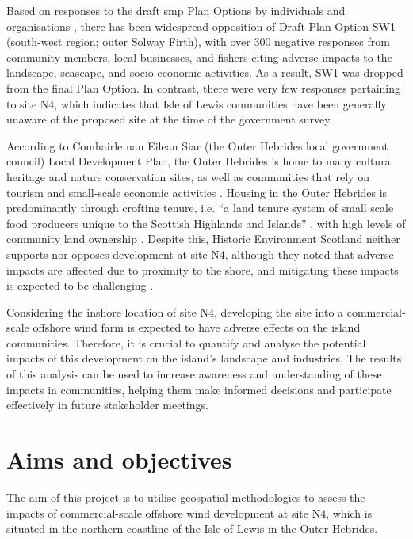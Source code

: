 Based on responses to the draft \gls{smp} Plan Options by individuals and organisations \autocite{govscot-smpresponses}, there has been widespread opposition of Draft Plan Option SW1 (south-west region; outer Solway Firth), with over 300 negative responses \autocite{govscot-smp} from community members, local businesses, and fishers citing adverse impacts to the landscape, seascape, and socio-economic activities. As a result, SW1 was dropped from the final Plan Option. In contrast, there were very few responses pertaining to site N4, which indicates that Isle of Lewis communities have been generally unaware of the proposed site at the time of the government survey.

According to Comhairle nan Eilean Siar (the Outer Hebrides local government council) Local Development Plan, the Outer Hebrides is home to many cultural heritage and nature conservation sites, as well as communities that rely on tourism and small-scale economic activities \autocite{cnes-ldp}. Housing in the Outer Hebrides is predominantly through crofting tenure, i.e. ``a land tenure system of small scale food producers unique to the Scottish Highlands and Islands'' \autocite{crofting}, with high levels of community land ownership \autocite{cnes-ldp}. Despite this, Historic Environment Scotland neither supports nor opposes development at site N4, although they noted that adverse impacts are affected due to proximity to the shore, and mitigating these impacts is expected to be challenging \autocite{govscot-smpresponses}.

Considering the inshore location of site N4, developing the site into a commercial-scale offshore wind farm is expected to have adverse effects on the island communities. Therefore, it is crucial to quantify and analyse the potential impacts of this development on the island's landscape and industries. The results of this analysis can be used to increase awareness and understanding of these impacts in communities, helping them make informed decisions and participate effectively in future stakeholder meetings.

\section{Aims and objectives}

The aim of this project is to utilise geospatial methodologies to assess the impacts of commercial-scale offshore wind development at site N4, which is situated in the northern coastline of the Isle of Lewis in the Outer Hebrides.

